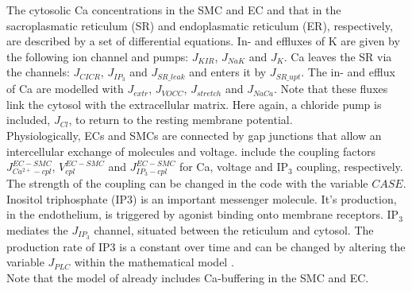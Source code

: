 The cytosolic \gls{Ca} concentrations in the SMC and EC and that in the sacroplasmatic reticulum (SR) and endoplasmatic reticulum (ER), respectively, are described by a set of differential equations. In- and effluxes  of \gls{K} are given by the following ion channel and pumps: $ J_{KIR} $, $ J_{NaK} $ and $ J_{K} $. \gls{Ca} leaves the SR via the channels: $ J_{CICR} $, $ J_{IP_3} $ and $ J_{SR\_leak} $ and enters it by $ J_{SR\_upt} $. The in- and efflux of \gls{Ca} are modelled with $ J_{extr} $, $ J_{VOCC} $, $ J_{stretch} $ and $ J_{NaCa} $. Note that these fluxes link the cytosol with the extracellular matrix. Here again, a chloride pump is included, $ J_{Cl} $, to return to the resting membrane potential.\\

Physiologically, ECs and SMCs are connected by gap junctions that allow an intercellular exchange of molecules and voltage.  \citet{Koenigsberger2006} include the coupling factors $J_{Ca^{2+}-cpl}^{EC-SMC}$, $V_{cpl}^{EC-SMC}$ and $J_{IP_{3}-cpl}^{EC-SMC}$ for \gls{Ca}, voltage and IP$ _3 $ coupling, respectively. The strength of the coupling can be changed in the code with the variable $ CASE $.\\

Inositol triphosphate (\gls{IP3}) is an important messenger molecule. It's production, in the endothelium, is triggered by agonist binding onto membrane receptors. IP$_3$ mediates the $ J_{IP_3} $ channel, situated between the reticulum and cytosol. 
The production rate of IP3 is a constant over time and can be changed by altering the variable  $ J_{PLC}$ within the mathematical model .\\

Note that the model of \citet{Koenigsberger2006} already includes \gls{Ca}-buffering in the SMC and EC.










